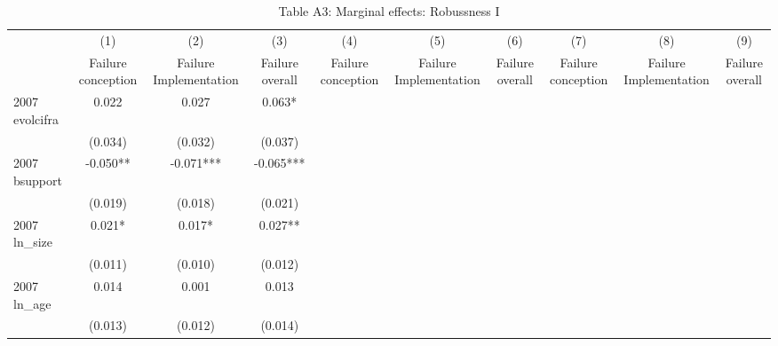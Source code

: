 \begin{table}[htbp]\centering
\def\sym#1{\ifmmode^{#1}\else\(^{#1}\)\fi}
\caption{{Table A3: Marginal effects: Robussness I}}
\begin{tabular}{l*{9}{c}}
\hline\hline
                    &\multicolumn{1}{c}{(1)}&\multicolumn{1}{c}{(2)}&\multicolumn{1}{c}{(3)}&\multicolumn{1}{c}{(4)}&\multicolumn{1}{c}{(5)}&\multicolumn{1}{c}{(6)}&\multicolumn{1}{c}{(7)}&\multicolumn{1}{c}{(8)}&\multicolumn{1}{c}{(9)}\\
                    &\multicolumn{1}{c}{Failure conception}&\multicolumn{1}{c}{Failure Implementation}&\multicolumn{1}{c}{Failure overall}&\multicolumn{1}{c}{Failure conception}&\multicolumn{1}{c}{Failure Implementation}&\multicolumn{1}{c}{Failure overall}&\multicolumn{1}{c}{Failure conception}&\multicolumn{1}{c}{Failure Implementation}&\multicolumn{1}{c}{Failure overall}\\
\hline
2007 evolcifra      &       0.022   &       0.027   &       0.063*  &               &               &               &               &               &               \\
                    &     (0.034)   &     (0.032)   &     (0.037)   &               &               &               &               &               &               \\
2007 bsupport       &      -0.050** &      -0.071***&      -0.065***&               &               &               &               &               &               \\
                    &     (0.019)   &     (0.018)   &     (0.021)   &               &               &               &               &               &               \\
2007 ln\_size        &       0.021*  &       0.017*  &       0.027** &               &               &               &               &               &               \\
                    &     (0.011)   &     (0.010)   &     (0.012)   &               &               &               &               &               &               \\
2007 ln\_age         &       0.014   &       0.001   &       0.013   &               &               &               &               &               &               \\
                    &     (0.013)   &     (0.012)   &     (0.014)   &               &               &               &               &               &               \\

\end{tabular}
\end{table}
